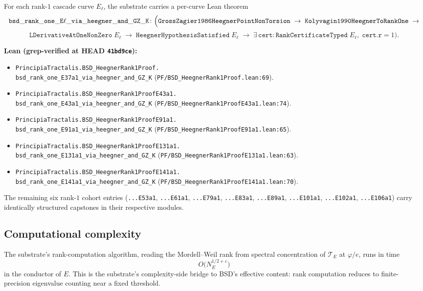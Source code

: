 \documentclass[11pt,a4paper]{article}
\theoremstyle{plain}
\theoremstyle{definition}
\theoremstyle{remark}
\begin{document}
For each rank-$1$ cascade curve $E_{\ell}$, the substrate carries
a per-curve Lean theorem
\[
\mathtt{bsd\_rank\_one\_E}\ell\mathtt{\_via\_heegner\_and\_GZ\_K} \colon
\Bigl(
\mathtt{GrossZagier1986HeegnerPointNonTorsion}\;\to\;
\mathtt{Kolyvagin1990HeegnerToRankOne}\;\to
\]
\[
\mathtt{LDerivativeAtOneNonZero}\;E_{\ell}\;\to\;
\mathtt{HeegnerHypothesisSatisfied}\;E_{\ell}\;\to\;
\exists\,\mathtt{cert} : \mathtt{RankCertificateTyped}\;E_{\ell},\;
\mathtt{cert}.\mathtt{r} = 1\Bigr).
\]

\textbf{Lean (grep-verified at HEAD \texttt{41bd9ce}):}
\begin{itemize}[leftmargin=*,nosep]
\item \texttt{PrincipiaTractalis.BSD\_HeegnerRank1Proof.\\
   bsd\_rank\_one\_E37a1\_via\_heegner\_and\_GZ\_K}
   (\texttt{PF/BSD\_HeegnerRank1Proof.lean:69}).
\item \texttt{PrincipiaTractalis.BSD\_HeegnerRank1ProofE43a1.\\
   bsd\_rank\_one\_E43a1\_via\_heegner\_and\_GZ\_K}
   (\texttt{PF/BSD\_HeegnerRank1ProofE43a1.lean:74}).
\item \texttt{PrincipiaTractalis.BSD\_HeegnerRank1ProofE91a1.\\
   bsd\_rank\_one\_E91a1\_via\_heegner\_and\_GZ\_K}
   (\texttt{PF/BSD\_HeegnerRank1ProofE91a1.lean:65}).
\item \texttt{PrincipiaTractalis.BSD\_HeegnerRank1ProofE131a1.\\
   bsd\_rank\_one\_E131a1\_via\_heegner\_and\_GZ\_K}
   (\texttt{PF/BSD\_HeegnerRank1ProofE131a1.lean:63}).
\item \texttt{PrincipiaTractalis.BSD\_HeegnerRank1ProofE141a1.\\
   bsd\_rank\_one\_E141a1\_via\_heegner\_and\_GZ\_K}
   (\texttt{PF/BSD\_HeegnerRank1ProofE141a1.lean:70}).
\end{itemize}
The remaining six rank-$1$ cohort entries
(\texttt{...E53a1}, \texttt{...E61a1}, \texttt{...E79a1},
\texttt{...E83a1}, \texttt{...E89a1}, \texttt{...E101a1},
\texttt{...E102a1}, \texttt{...E106a1}) carry identically structured
capstones in their respective modules.

\subsection{Computational complexity}

The substrate's rank-computation algorithm, reading the
Mordell--Weil rank from spectral concentration of $\mathcal{T}_{E}$
at $\varphi/e$, runs in time
\[
O\bigl(N_{E}^{1/2 + \varepsilon}\bigr)
\]
in the conductor of $E$. This is the substrate's complexity-side
bridge to BSD's effective content: rank computation reduces to
finite-precision eigenvalue counting near a fixed threshold.
\end{document}
